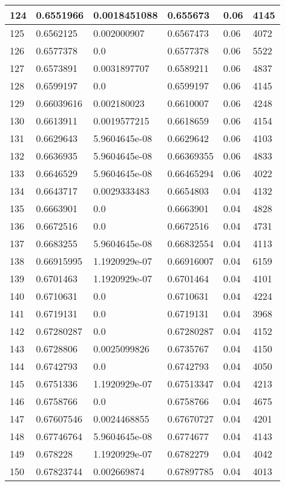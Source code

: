 \begin{longtable}{|l|l|l|l|l|l|}
124 & 0.6551966 & 0.0018451088 & 0.655673 & 0.06 & 4145 \\ \hline 
125 & 0.6562125 & 0.002000907 & 0.6567473 & 0.06 & 4072 \\ \hline 
126 & 0.6577378 & 0.0 & 0.6577378 & 0.06 & 5522 \\ \hline 
127 & 0.6573891 & 0.0031897707 & 0.6589211 & 0.06 & 4837 \\ \hline 
128 & 0.6599197 & 0.0 & 0.6599197 & 0.06 & 4145 \\ \hline 
129 & 0.66039616 & 0.002180023 & 0.6610007 & 0.06 & 4248 \\ \hline 
130 & 0.6613911 & 0.0019577215 & 0.6618659 & 0.06 & 4154 \\ \hline 
131 & 0.6629643 & 5.9604645e-08 & 0.6629642 & 0.06 & 4103 \\ \hline 
132 & 0.6636935 & 5.9604645e-08 & 0.66369355 & 0.06 & 4833 \\ \hline 
133 & 0.6646529 & 5.9604645e-08 & 0.66465294 & 0.06 & 4022 \\ \hline 
134 & 0.6643717 & 0.0029333483 & 0.6654803 & 0.04 & 4132 \\ \hline 
135 & 0.6663901 & 0.0 & 0.6663901 & 0.04 & 4828 \\ \hline 
136 & 0.6672516 & 0.0 & 0.6672516 & 0.04 & 4731 \\ \hline 
137 & 0.6683255 & 5.9604645e-08 & 0.66832554 & 0.04 & 4113 \\ \hline 
138 & 0.66915995 & 1.1920929e-07 & 0.66916007 & 0.04 & 6159 \\ \hline 
139 & 0.6701463 & 1.1920929e-07 & 0.6701464 & 0.04 & 4101 \\ \hline 
140 & 0.6710631 & 0.0 & 0.6710631 & 0.04 & 4224 \\ \hline 
141 & 0.6719131 & 0.0 & 0.6719131 & 0.04 & 3968 \\ \hline 
142 & 0.67280287 & 0.0 & 0.67280287 & 0.04 & 4152 \\ \hline 
143 & 0.6728806 & 0.0025099826 & 0.6735767 & 0.04 & 4150 \\ \hline 
144 & 0.6742793 & 0.0 & 0.6742793 & 0.04 & 4050 \\ \hline 
145 & 0.6751336 & 1.1920929e-07 & 0.67513347 & 0.04 & 4213 \\ \hline 
146 & 0.6758766 & 0.0 & 0.6758766 & 0.04 & 4675 \\ \hline 
147 & 0.67607546 & 0.0024468855 & 0.67670727 & 0.04 & 4201 \\ \hline 
148 & 0.67746764 & 5.9604645e-08 & 0.6774677 & 0.04 & 4143 \\ \hline 
149 & 0.678228 & 1.1920929e-07 & 0.6782279 & 0.04 & 4042 \\ \hline 
150 & 0.67823744 & 0.002669874 & 0.67897785 & 0.04 & 4013 \\ \hline 
\end{longtable}